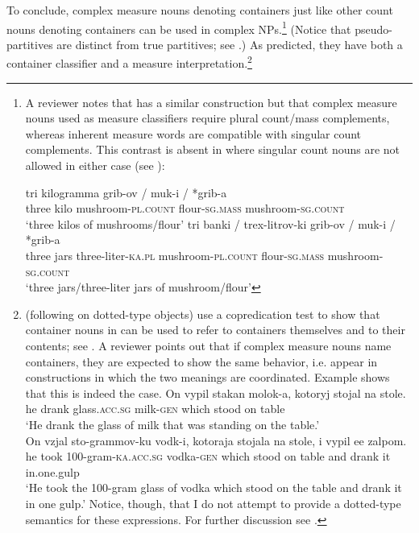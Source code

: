 \documentclass[output=paper]{langscibook}
\begin{document}

\noindent To conclude, complex measure nouns denoting containers just like other count nouns denoting containers can be used in complex NPs.\footnote{A reviewer notes that  has a similar construction but that complex measure nouns used as measure classifiers require plural count/mass complements, whereas inherent measure words are compatible with singular count complements. This contrast is absent in  where singular count nouns are not allowed in either case (see \citealt{Khrizman2014, Khrizman2016}):

    \ea \gll tri kilogramma grib-ov / muk-i / *grib-a \\
    three kilo mushroom-\textsc{pl.count} {} flour-\textsc{sg.mass} {} \phantom{*}mushroom-\textsc{sg.count}\\
    \glt `three kilos of mushrooms/flour'
    \ex \gll tri banki / trex-litrov-ki grib-ov / muk-i / *grib-a \\
    three jars {} three-liter-\textsc{ka.pl} mushroom-\textsc{pl.count} {} flour-\textsc{sg.mass} {} \phantom{*}mushroom-\textsc{sg.count}\\
    \glt `three jars/three-liter jars of mushroom/flour'
    \z
    } (Notice that pseudo-partitives are distinct from true partitives; see \citealt{Koptjevskaja-Tamm2011}.) As predicted, they have both a container classifier and a measure interpretation.\footnote{\citet{Partee.Borschev2012} (following \citealt{Pustejovsky1993} on dotted-type objects) use a copredication test to show that container nouns in  can be used to refer to containers themselves and to their contents; see . A reviewer points out that if complex measure nouns name containers, they are expected to show the same behavior, i.e. appear in constructions in which the two meanings are coordinated. Example  shows that this is indeed the case.
    \ea\label{f:3} \gll On vypil stakan molok-a, kotoryj stojal na stole.\\
    he drank glass.\textsc{acc.sg} milk-\textsc{gen} which stood on table\\
    \glt `He drank the glass of milk that was standing on the table.'\\
    \ex\label{f:4} \gll On vzjal sto-grammov-ku vodk-i, kotoraja stojala na stole, i vypil ee zalpom.\\
    he took 100-gram-\textsc{ka.acc.sg} vodka-\textsc{gen} which stood on table and drank it in.one.gulp\\
    \glt `He took the 100-gram glass of vodka which stood on the table and drank it in one gulp.'
    \z
Notice, though, that I do not attempt to provide a dotted-type semantics for these expressions. For further discussion see \citet{Partee.Borschev2012}.
    }
\end{document}

